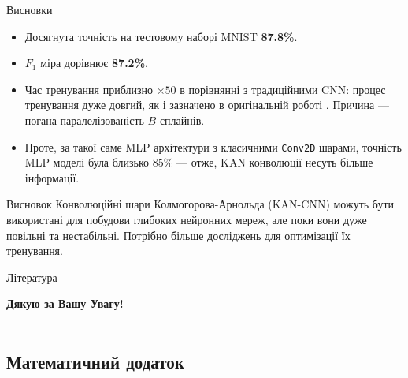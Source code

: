 \documentclass{zkdl-presentation-template}
\begin{document}
    \begin{frame}{Висновки}
        \begin{itemize}
            \item Досягнута точність на тестовому наборі MNIST \textbf{87.8\%}. 
            \item $F_1$ міра дорівнює \textbf{87.2\%}.
            \item Час тренування приблизно $\times 50$ в порівнянні з 
            традиційними CNN: процес тренування дуже довгий, як і зазначено в 
            оригінальній роботі \cite{kan}. Причина --- погана паралелізованість 
            $B$-сплайнів.
            \item Проте, за такої саме MLP архітектури з класичними
            \texttt{Conv2D} шарами, точність MLP моделі була близько $85\%$ --- отже,
            KAN конволюції несуть більше інформації.
        \end{itemize}

        \begin{alertblock}{Висновок}
            Конволюційні шари Колмогорова-Арнольда (KAN-CNN) можуть бути
            використані для побудови глибоких нейронних мереж, але поки вони
            дуже повільні та нестабільні. Потрібно більше досліджень для
            оптимізації їх тренування.
        \end{alertblock}
    \end{frame}

    \begin{frame}[allowframebreaks]{Література}
        \printbibliography
    \end{frame}

    \begin{frame}
      \centering
      \LARGE
      \textbf{Дякую за Вашу Увагу!} \\
      
      \vspace{0.2cm} \Huge {} \large \\
    \end{frame}

    \subsection*{Математичний додаток}
\end{document}
